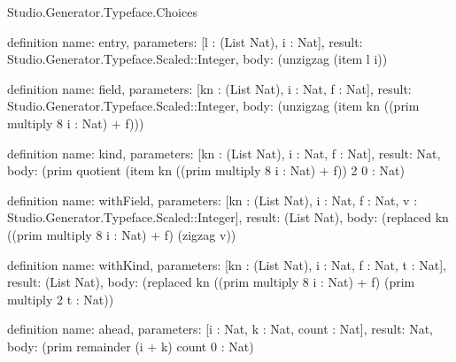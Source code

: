 \begin{lexlean}{Studio.Generator.Typeface.Choices}
\begin{semanticmodule}
definition{
  name: entry,
  parameters: [l : (List Nat), i : Nat],
  result: Studio.Generator.Typeface.Scaled::Integer,
  body: (unzigzag (item l i))
}

definition{
  name: field,
  parameters: [kn : (List Nat), i : Nat, f : Nat],
  result: Studio.Generator.Typeface.Scaled::Integer,
  body: (unzigzag (item kn ((prim multiply 8 i : Nat) + f)))
}

definition{
  name: kind,
  parameters: [kn : (List Nat), i : Nat, f : Nat],
  result: Nat,
  body: (prim quotient (item kn ((prim multiply 8 i : Nat) + f)) 2 0 : Nat)
}

definition{
  name: withField,
  parameters: [kn : (List Nat), i : Nat, f : Nat, v : Studio.Generator.Typeface.Scaled::Integer],
  result: (List Nat),
  body: (replaced kn ((prim multiply 8 i : Nat) + f) (zigzag v))
}

definition{
  name: withKind,
  parameters: [kn : (List Nat), i : Nat, f : Nat, t : Nat],
  result: (List Nat),
  body: (replaced kn ((prim multiply 8 i : Nat) + f) (prim multiply 2 t : Nat))
}

definition{
  name: ahead,
  parameters: [i : Nat, k : Nat, count : Nat],
  result: Nat,
  body: (prim remainder (i + k) count 0 : Nat)
}


\end{semanticmodule}
\end{lexlean}
